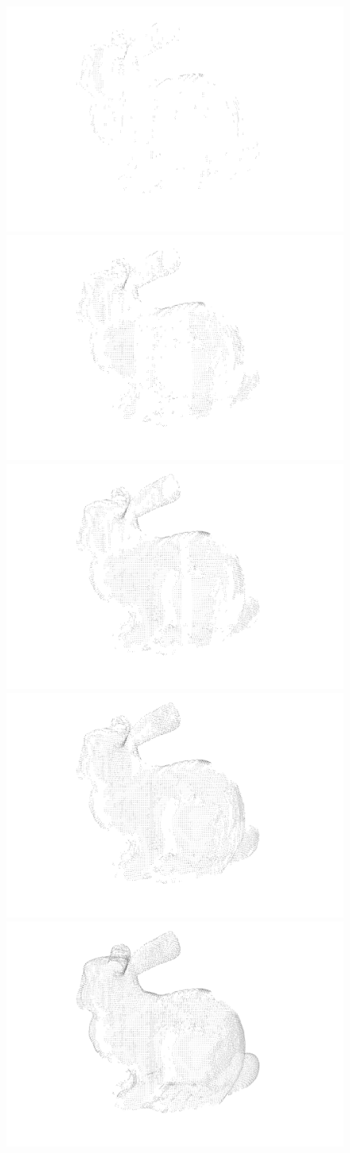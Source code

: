 \documentclass[hyperref, beleg, german]{cgvpub}
\begin{document}
\begin{figure}
	\centering
	\includegraphics[width = .48\linewidth]{images/incrementalLoading/95}%
	\includegraphics[width = .48\linewidth]{images/incrementalLoading/97}
	\includegraphics[width = .48\linewidth]{images/incrementalLoading/99}%
	\includegraphics[width = .48\linewidth]{images/incrementalLoading/101}
	\includegraphics[width = .48\linewidth]{images/incrementalLoading/105}%

\end{figure}
\end{document}
